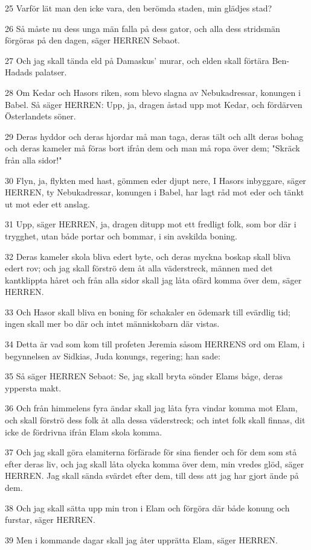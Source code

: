 \par 25 Varför lät man den icke vara, den berömda staden, min glädjes stad?
\par 26 Så måste nu dess unga män falla på dess gator, och alla dess stridsmän förgöras på den dagen, säger HERREN Sebaot.
\par 27 Och jag skall tända eld på Damaskus' murar, och elden skall förtära Ben-Hadads palatser.
\par 28 Om Kedar och Hasors riken, som blevo slagna av Nebukadressar, konungen i Babel. Så säger HERREN: Upp, ja, dragen åstad upp mot Kedar, och fördärven Österlandets söner.
\par 29 Deras hyddor och deras hjordar må man taga, deras tält och allt deras bohag och deras kameler må föras bort ifrån dem och man må ropa över dem; "Skräck från alla sidor!"
\par 30 Flyn, ja, flykten med hast, gömmen eder djupt nere, I Hasors inbyggare, säger HERREN, ty Nebukadressar, konungen i Babel, har lagt råd mot eder och tänkt ut mot eder ett anslag.
\par 31 Upp, säger HERREN, ja, dragen ditupp mot ett fredligt folk, som bor där i trygghet, utan både portar och bommar, i sin avskilda boning.
\par 32 Deras kameler skola bliva edert byte, och deras myckna boskap skall bliva edert rov; och jag skall förströ dem åt alla väderstreck, männen med det kantklippta håret och från alla sidor skall jag låta ofärd komma över dem, säger HERREN.
\par 33 Och Hasor skall bliva en boning för schakaler en ödemark till evärdlig tid; ingen skall mer bo där och intet människobarn där vistas.
\par 34 Detta är vad som kom till profeten Jeremia såsom HERRENS ord om Elam, i begynnelsen av Sidkias, Juda konungs, regering; han sade:
\par 35 Så säger HERREN Sebaot: Se, jag skall bryta sönder Elams båge, deras yppersta makt.
\par 36 Och från himmelens fyra ändar skall jag låta fyra vindar komma mot Elam, och skall förströ dess folk åt alla dessa väderstreck; och intet folk skall finnas, dit icke de fördrivna ifrån Elam skola komma.
\par 37 Och jag skall göra elamiterna förfärade för sina fiender och för dem som stå efter deras liv, och jag skall låta olycka komma över dem, min vredes glöd, säger HERREN. Jag skall sända svärdet efter dem, till dess att jag har gjort ände på dem.
\par 38 Och jag skall sätta upp min tron i Elam och förgöra där både konung och furstar, säger HERREN.
\par 39 Men i kommande dagar skall jag åter upprätta Elam, säger HERREN.

